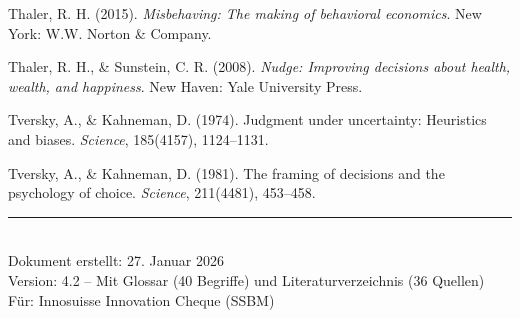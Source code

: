 \documentclass[11pt,a4paper]{article}
\begin{document}
\vspace{0.3cm}
Thaler, R. H. (2015). \textit{Misbehaving: The making of behavioral economics}. New York: W.W. Norton \& Company.

\vspace{0.3cm}
Thaler, R. H., \& Sunstein, C. R. (2008). \textit{Nudge: Improving decisions about health, wealth, and happiness}. New Haven: Yale University Press.

\vspace{0.3cm}
Tversky, A., \& Kahneman, D. (1974). Judgment under uncertainty: Heuristics and biases. \textit{Science}, 185(4157), 1124--1131.

\vspace{0.3cm}
Tversky, A., \& Kahneman, D. (1981). The framing of decisions and the psychology of choice. \textit{Science}, 211(4481), 453--458.

\vspace{2cm}

\begin{center}
\rule{0.4\textwidth}{0.5pt}\\[0.5em]
{\small Dokument erstellt: 27. Januar 2026}\\
{\small Version: 4.2 -- Mit Glossar (40 Begriffe) und Literaturverzeichnis (36 Quellen)}\\
{\small Für: Innosuisse Innovation Cheque (SSBM)}
\end{center}
\end{document}
